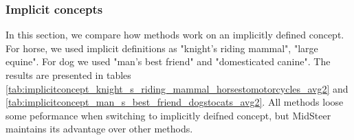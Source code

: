 \subsubsection{Implicit concepts}

In this section, we compare how methods work on an implicitly defined concept. For horse, we used implicit definitions as "knight's riding mammal", "large equine". For dog we used "man's best friend" and "domesticated canine". The results are presented in tables \ref{tab:implicitconcept_knight_s_riding_mammal_horsestomotorcycles_avg2} and \ref{tab:implicitconcept_man_s_best_friend_dogstocats_avg2}. All methods loose some peformance when switching to implicitly deifned concept, but MidSteer maintains its advantage over other methods.

